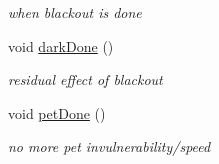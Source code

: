 \begin{DoxyCompactItemize}
\begin{DoxyCompactList}\small\item\em when blackout is done \end{DoxyCompactList}\item 
\hypertarget{class_dialog_a5e653743b5e3ec76e987c4255ab01865}{void \hyperlink{class_dialog_a5e653743b5e3ec76e987c4255ab01865}{dark\-Done} ()}\label{class_dialog_a5e653743b5e3ec76e987c4255ab01865}

\begin{DoxyCompactList}\small\item\em residual effect of blackout \end{DoxyCompactList}\item 
\hypertarget{class_dialog_a3631980bb77b7deb3bd2aceee3776605}{void \hyperlink{class_dialog_a3631980bb77b7deb3bd2aceee3776605}{pet\-Done} ()}\label{class_dialog_a3631980bb77b7deb3bd2aceee3776605}

\begin{DoxyCompactList}\small\item\em no more pet invulnerability/speed \end{DoxyCompactList}\end{DoxyCompactItemize}
